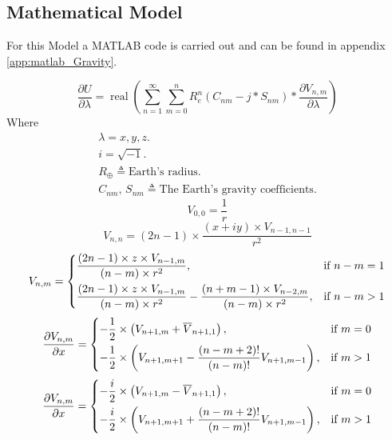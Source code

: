 \subsection{Mathematical Model}
For this Model a MATLAB code is carried out and can be found in appendix \ref{app:matlab_Gravity}.

\begin{equation}
\frac{\partial U}{\partial \lambda}=\operatorname{real}\left(\sum_{n=1}^{\infty} \sum_{m=0}^{n} R_{e}^{n}\left(C_{n m}-j * S_{n m}\right) * \frac{\partial V_{n, m}}{\partial \lambda}\right)
\end{equation}
Where
\begin{gather*} 
\lambda = x, y, z.\\
i =\sqrt{-1}.\\
R_{\oplus} \triangleq \text{Earth’s radius}.\\
C_{nm}, \, S_{nm} \triangleq \text{The Earth's gravity coefficients}.
\end{gather*}
\begin{equation}
    V_{0,0} = \frac{1}{r}
\end{equation}
\begin{equation}
    V_{n,n} = (2n - 1) \times \frac{(x+iy)\times V_{n-1,n-1}}{r^2}
\end{equation}
\begin{gather} 
V_{n,m} = \begin{dcases}
 \frac{(2n-1)\times z \times V_{n-1,m}}{(n-m)\times r^2}, &\mbox{if } n-m = 1 \\
 \frac{(2n-1) \times z \times V_{n-1,m}}{(n-m)\times r^2} - \frac{(n+m-1)\times  V_{n-2,m}}{(n-m) \times r^2}, &\mbox{if } n-m > 1
\end{dcases}
\end{gather}
\begin{gather}
    \frac{\partial V_{n,m}}{\partial x} = \begin{dcases}
    - \frac{1}{2} \times \left(V_{n+1,m} + \overline{V}_{n+1,1} \right) , &\mbox{if } m = 0 \\
    -\frac{1}{2} \times \left(V_{n+1,m+1} - \frac{(n-m+2)!}{(n-m)!} V_{n+1,m-1} \right), &\mbox{if } m > 1
\end{dcases}
\end{gather}
\begin{gather}
   \frac{\partial V_{n,m}}{\partial x} = \begin{dcases}
    - \frac{i}{2} \times \left(V_{n+1,m} - \overline{V}_{n+1,1} \right) , &\mbox{if } m = 0 \\
    -\frac{i}{2} \times \left(V_{n+1,m+1} + \frac{(n-m+2)!}{(n-m)!} V_{n+1,m-1} \right), &\mbox{if } m > 1
\end{dcases}
\end{gather}
